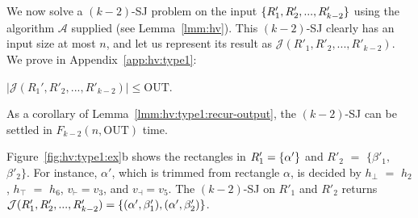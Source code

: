 \documentclass[acmsmall,review,anonymous]{acmart}
\def\vgap{\vspace{1mm}}
\def\extraspacing{\vspace{2mm} \noindent}
\def\A{\mathcal{A}}
\def\J{\mathcal{J}}
\def\out{\mathrm{OUT}}
\begin{document}
\vgap

We now solve a $(k-2)$-SJ problem on the input $\{R_1', R_2', ..., R_{k-2}'\}$ using the algorithm $\A$ supplied (see Lemma~\ref{lmm:hv}). This $(k-2)$-SJ clearly has an input size at most $n$, and let us represent its result as $\J(R'_1, R'_2, ..., R'_{k-2})$. We prove in Appendix~\ref{app:hv:type1}:

\begin{lemma} \label{lmm:hv:type1:recur-output}
    $|\J(R_1', R'_2, ..., R'_{k-2})| \le \out$.
\end{lemma}

As a corollary of Lemma~\ref{lmm:hv:type1:recur-output}, the $(k-2)$-SJ can be settled in $F_{k-2}(n, \out)$ time.

\extraspacing {\underline{\em Example 4.2.}} Figure~\ref{fig:hv:type1:ex}b shows the rectangles in $R'_1 = \{\alpha'\}$ and $R'_2$ $=$ $\{\beta'_1,$ $\beta'_2\}$. For instance, $\alpha'$, which is trimmed from rectangle $\alpha$, is decided by $h_\bot$ $=$ $h_2$, $h_\top$ $=$ $h_6$, $v_\vdash = v_3$, and $v_\dashv = v_5$. The $(k-2)$-SJ on $R'_1$ and $R'_2$ returns $\J(R_1', R'_2, ..., R'_{k-2}) = \set{(\alpha', \beta_1'), (\alpha', \beta_2')}$.
\done
\end{document}
